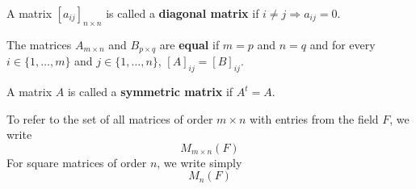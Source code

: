 \begin{definition}\label{def:diagonal-matrix}
    A matrix $[a_{ij}]_{n \times n}$ is called a \textbf{diagonal matrix} if $i \neq j \Rightarrow a_{ij} = 0$.
\end{definition}

\begin{definition}\label{def:matrix-equality}
    The matrices $A_{m \times n}$ and $B_{p \times q}$ are \textbf{equal} if $m = p$ and $n = q$ and for every $i \in \{1, \ldots, m\}$ and $j \in \{1, \ldots, n\}$, $[A]_{ij} = [B]_{ij}$.
\end{definition}

\begin{definition}\label{def:symmetric-matrix}
    A matrix $A$ is called a \textbf{symmetric matrix} if $A^t = A$.
\end{definition}

\begin{notation}
    To refer to the set of all matrices of order $m \times n$ with entries from the field $F$, we write
    \[
    M_{m \times n}(F)
    \]
    For square matrices of order $n$, we write simply
    \[
    M_n(F)
    \]
\end{notation}